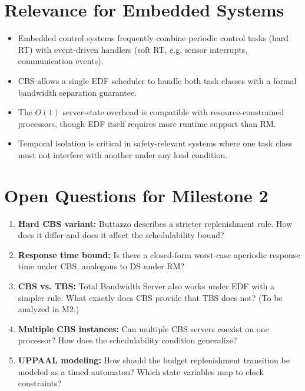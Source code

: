 \documentclass[conference]{IEEEtran}
\begin{document}
\section{Relevance for Embedded Systems}

\begin{itemize}
  \item Embedded control systems frequently combine periodic control
        tasks (hard RT) with event-driven handlers (soft RT, e.g.
        sensor interrupts, communication events).
  \item CBS allows a single EDF scheduler to handle both task classes
        with a formal bandwidth separation guarantee.
  \item The $O(1)$ server-state overhead is compatible with
        resource-constrained processors, though EDF itself requires
        more runtime support than RM.
  \item Temporal isolation is critical in safety-relevant systems
        where one task class must not interfere with another under
        any load condition.
\end{itemize}

\section{Open Questions for Milestone 2}

\begin{enumerate}
  \item \textbf{Hard CBS variant:} Buttazzo describes a stricter
        replenishment rule. How does it differ and does it affect the
        schedulability bound?
  \item \textbf{Response time bound:} Is there a closed-form worst-case
        aperiodic response time under CBS, analogous to DS under RM?
  \item \textbf{CBS vs. TBS:} Total Bandwidth Server also works under
        EDF with a simpler rule. What exactly does CBS provide that TBS
        does not? (To be analyzed in M2.)
  \item \textbf{Multiple CBS instances:} Can multiple CBS servers
        coexist on one processor? How does the schedulability condition
        generalize?
  \item \textbf{UPPAAL modeling:} How should the budget replenishment
        transition be modeled as a timed automaton? Which state
        variables map to clock constraints?
\end{enumerate}
\end{document}

